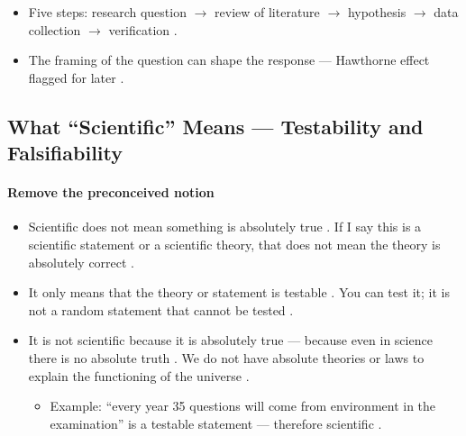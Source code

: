 \begin{QuickRevision}
\begin{itemize}
    \item Five steps: research question $\rightarrow$ review of literature $\rightarrow$ hypothesis $\rightarrow$ data collection $\rightarrow$ verification .
    \item The framing of the question can shape the response --- Hawthorne effect flagged for later .
\end{itemize}
\end{QuickRevision}

\subsection{What ``Scientific'' Means --- Testability and Falsifiability}

\paragraph{Remove the preconceived notion}
\begin{itemize}
    \item Scientific does not mean something is absolutely true . If I say this is a scientific statement or a scientific theory, that does not mean the theory is absolutely correct .
    \item It only means that the theory or statement is testable . You can test it; it is not a random statement that cannot be tested .
    \item It is not scientific because it is absolutely true --- because even in science there is no absolute truth . We do not have absolute theories or laws to explain the functioning of the universe .
    \begin{itemize}
        \item Example: ``every year 35 questions will come from environment in the examination'' is a testable statement --- therefore scientific .
    \end{itemize}
\end{itemize}

